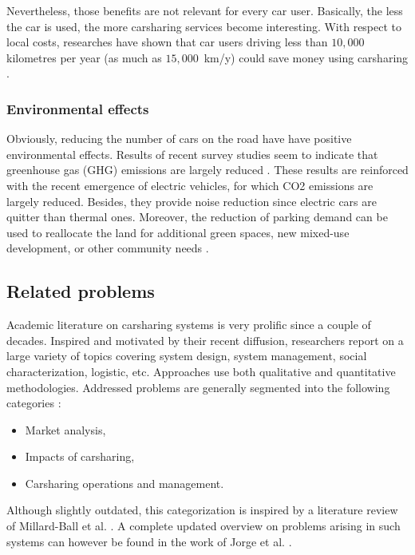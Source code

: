 \medskip
Nevertheless, those benefits are not relevant for every car user.
Basically, the less the car is used, the more carsharing services become interesting.
With respect to local costs, researches have shown that car users driving less than $10,000$ kilometres per year (as much as \hbox{$15,000$ km/y}) could save money using carsharing \cite{litman_evaluating_2000, prettenthaler_ownership_1999}.



\subsubsection{Environmental effects}

Obviously, reducing the number of cars on the road have have positive environmental effects.
Results of recent survey studies seem to indicate that greenhouse gas (GHG) emissions are largely reduced 
\cite{martin_greenhouse_2011, firnkorn_what_2011}.
These results are reinforced with the recent emergence of electric vehicles, for which CO2 emissions are largely reduced.
Besides, they provide noise reduction since electric cars are quitter than thermal ones.
Moreover, the reduction of parking demand can be used to reallocate the land for additional green spaces, new mixed-use development, or other community needs \cite{cohen_carsharing_2008}.


\subsection{Related problems}

Academic literature on carsharing systems is very prolific since a couple of decades.
Inspired and motivated by their recent diffusion, researchers report on a large variety of topics covering system design, system management, social characterization, logistic, etc.
Approaches use both qualitative and quantitative methodologies.
Addressed problems are generally segmented into the following categories \cite{ciari_sharing_2012}:
\begin{itemize}
\item Market analysis,
\item Impacts of carsharing,
\item Carsharing operations and management.
\end{itemize}

Although slightly outdated, this categorization is inspired by a literature review of Millard-Ball et al. \cite{millard_ball_car_sharing_2005}.
A complete updated overview on problems arising in such systems can however be found in the work of Jorge et al. \cite{jorge_carsharing_2013}.

